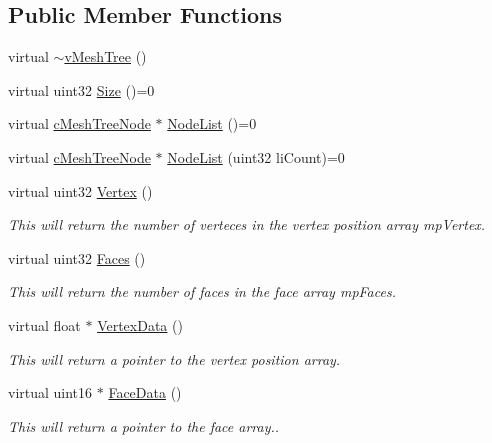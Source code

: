 \subsection*{Public Member Functions}
\begin{DoxyCompactItemize}
\item 
virtual \hyperlink{classv_mesh_tree_a370d8a4758edd95597801128d0b8ac0c}{$\sim$vMeshTree} ()
\item 
virtual uint32 \hyperlink{classv_mesh_tree_ad49d1e3b62956162617b2132a28867cf}{Size} ()=0
\item 
virtual \hyperlink{classc_mesh_tree_node}{cMeshTreeNode} $\ast$ \hyperlink{classv_mesh_tree_ad4e0ba0e05318672d33df4c4309db09c}{NodeList} ()=0
\item 
virtual \hyperlink{classc_mesh_tree_node}{cMeshTreeNode} $\ast$ \hyperlink{classv_mesh_tree_aaebe5c0c80aad76fd2f6e43561d1a7ae}{NodeList} (uint32 liCount)=0
\item 
virtual uint32 \hyperlink{classv_mesh_tree_a3dce3413d17c131f29aa2a7ed65f56d5}{Vertex} ()
\begin{DoxyCompactList}\small\item\em This will return the number of verteces in the vertex position array mpVertex. \item\end{DoxyCompactList}\item 
virtual uint32 \hyperlink{classv_mesh_tree_a1ed307021481e5f663def1170d72e4e7}{Faces} ()
\begin{DoxyCompactList}\small\item\em This will return the number of faces in the face array mpFaces. \item\end{DoxyCompactList}\item 
virtual float $\ast$ \hyperlink{classv_mesh_tree_a83e604d02695f55496ba5b385e951181}{VertexData} ()
\begin{DoxyCompactList}\small\item\em This will return a pointer to the vertex position array. \item\end{DoxyCompactList}\item 
virtual uint16 $\ast$ \hyperlink{classv_mesh_tree_a9a485afe644254eb4f1affc731f0a6b9}{FaceData} ()
\begin{DoxyCompactList}\small\item\em This will return a pointer to the face array.. \item\end{DoxyCompactList}\item 

\end{DoxyCompactItemize}
